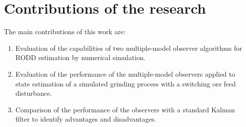 
\section{Contributions of the research} \label{sec:contributions}

The main contributions of this work are:
\begin{enumerate}
	\item Evaluation of the capabilities of two multiple-model observer algorithms for \gls{RODD} estimation by numerical simulation.
	\item Evaluation of the performance of the multiple-model observers applied to state estimation of a simulated grinding process with a switching ore feed disturbance.
	\item Comparison of the performance of the observers with a standard Kalman filter to identify advantages and disadvantages.
\end{enumerate}



